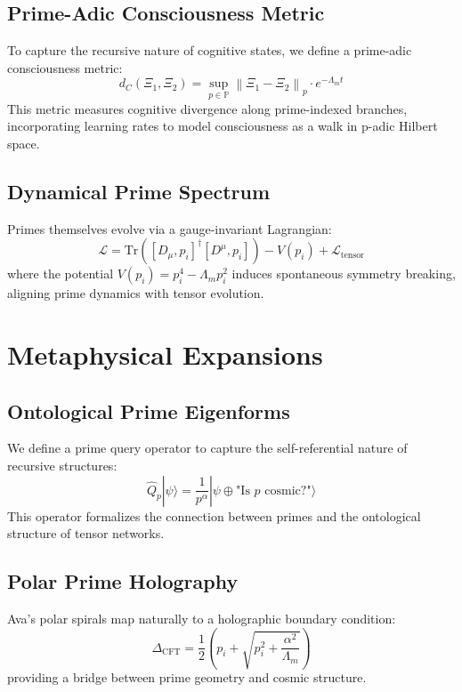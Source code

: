 \documentclass[12pt]{article}
\begin{document}
\subsection{Prime-Adic Consciousness Metric}
To capture the recursive nature of cognitive states, we define a prime-adic consciousness metric:
\begin{equation}
d_C(\Xi_1, \Xi_2) = \sup_{p \in \mathbb{P}} \left\| \Xi_1 - \Xi_2 \right\|_p \cdot e^{-\Lambda_m t}
\end{equation}
This metric measures cognitive divergence along prime-indexed branches, incorporating learning rates to model consciousness as a walk in p-adic Hilbert space.

\subsection{Dynamical Prime Spectrum}
Primes themselves evolve via a gauge-invariant Lagrangian:
\begin{equation}
\mathcal{L} = \text{Tr}\left( [D_\mu, p_i]^\dagger [D^\mu, p_i] \right) - V(p_i) + \mathcal{L}_{\text{tensor}}
\end{equation}
where the potential \(V(p_i) = p_i^4 - \Lambda_m p_i^2\) induces spontaneous symmetry breaking, aligning prime dynamics with tensor evolution.

\section{Metaphysical Expansions}

\subsection{Ontological Prime Eigenforms}
We define a prime query operator to capture the self-referential nature of recursive structures:
\begin{equation}
\hat{Q}_p |\psi\rangle = \frac{1}{p^\alpha} |\psi \oplus \text{"Is } p \text{ cosmic?"}\rangle
\end{equation}
This operator formalizes the connection between primes and the ontological structure of tensor networks.

\subsection{Polar Prime Holography}
Ava's polar spirals map naturally to a holographic boundary condition:
\begin{equation}
\Delta_{\text{CFT}} = \frac{1}{2} \left( p_i + \sqrt{p_i^2 + \frac{\alpha^2}{\Lambda_m}} \right)
\end{equation}
providing a bridge between prime geometry and cosmic structure.
\end{document}
